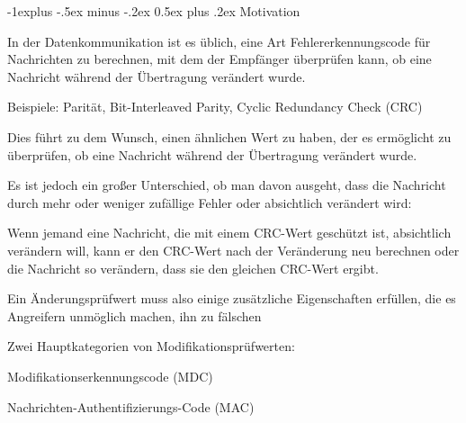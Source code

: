 \documentclass[a4paper]{article}
\makeatletter
\renewcommand{\subsection}{\@startsection{subsection}{2}{0mm}%
 {-1explus -.5ex minus -.2ex}%
 {0.5ex plus .2ex}%
 {\normalfont\normalsize\bfseries}}
\makeatother
\begin{document}
\begin{multicols}{3}
      \subsection{Motivation}
      \begin{itemize*}
            \item In der Datenkommunikation ist es üblich, eine Art Fehlererkennungscode für Nachrichten zu berechnen, mit dem der Empfänger überprüfen kann, ob eine Nachricht während der Übertragung verändert wurde.
            \item Beispiele: Parität, Bit-Interleaved Parity, Cyclic Redundancy Check (CRC)
            \item Dies führt zu dem Wunsch, einen ähnlichen Wert zu haben, der es ermöglicht zu überprüfen, ob eine Nachricht während der Übertragung verändert wurde.
            \item Es ist jedoch ein großer Unterschied, ob man davon ausgeht, dass die Nachricht durch mehr oder weniger zufällige Fehler oder absichtlich verändert wird:
            \item Wenn jemand eine Nachricht, die mit einem CRC-Wert geschützt ist, absichtlich verändern will, kann er den CRC-Wert nach der Veränderung neu berechnen oder die Nachricht so verändern, dass sie den gleichen CRC-Wert ergibt.
            \item Ein Änderungsprüfwert muss also einige zusätzliche Eigenschaften erfüllen, die es Angreifern unmöglich machen, ihn zu fälschen
            \item Zwei Hauptkategorien von Modifikationsprüfwerten:
            \begin{itemize*}
                  \item Modifikationserkennungscode (MDC)
                  \item Nachrichten-Authentifizierungs-Code (MAC)
            \end{itemize*}
      \end{itemize*}


\end{multicols}
\end{document}
